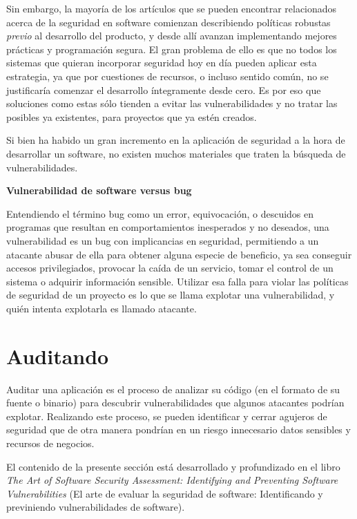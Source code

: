 Sin embargo, la mayoría de los artículos que se pueden encontrar relacionados acerca de la seguridad en software comienzan describiendo políticas robustas \textit{previo} al desarrollo del producto, y desde allí avanzan implementando mejores prácticas y programación segura. El gran problema de ello es que no todos los sistemas que quieran incorporar seguridad hoy en día pueden aplicar esta estrategia, ya que por cuestiones de recursos, o incluso sentido común, no se justificaría comenzar el desarrollo íntegramente desde cero. Es por eso que soluciones como estas sólo tienden a evitar las vulnerabilidades y no tratar las posibles ya existentes, para proyectos que ya estén creados.

Si bien ha habido un gran incremento en la aplicación de seguridad a la hora de desarrollar un software, no existen muchos materiales que traten la búsqueda de vulnerabilidades.

\begin{notesBox}
\textbf{Vulnerabilidad de software versus bug}

Entendiendo el término bug como un error, equivocación, o descuidos en programas que resultan en comportamientos inesperados y no deseados, una vulnerabilidad es un bug con implicancias en seguridad, permitiendo a un atacante abusar de ella para obtener alguna especie de beneficio, ya sea conseguir accesos privilegiados, provocar la caída de un servicio, tomar el control de un sistema o adquirir información sensible. Utilizar esa falla para violar las políticas de seguridad de un proyecto es lo que se llama explotar una vulnerabilidad, y quién intenta explotarla es llamado atacante.
\end{notesBox}

\section{Auditando}
Auditar una aplicación es el proceso de analizar su código (en el formato de su fuente o binario) para descubrir vulnerabilidades que algunos atacantes podrían explotar. Realizando este proceso, se pueden identificar y cerrar agujeros de seguridad que de otra manera pondrían en un riesgo innecesario datos sensibles y recursos de negocios.

El contenido de la presente sección está desarrollado y profundizado en el libro \textit{The Art of Software Security Assessment: Identifying and Preventing Software Vulnerabilities}\cite{Dowd:2006:ASS:1196394} (El arte de evaluar la seguridad de software: Identificando y previniendo vulnerabilidades de software).

